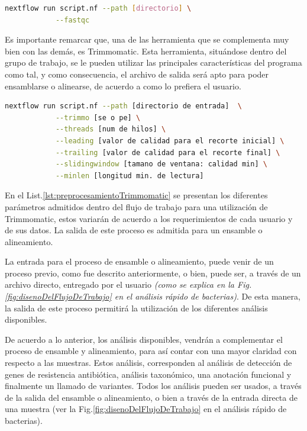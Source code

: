 \documentclass[12pt]{article}
\begin{document}
\begin{center}
    \begin{lstlisting}[language=bash, caption=Comando para el preprocesamiento de las lecturas con Fastqc \emph{(elaboración propia)}., label=lst:preprocesamientoFastqc]
        nextflow run script.nf --path [directorio] \
            --fastqc
    \end{lstlisting}
\end{center}

Es importante remarcar que, una de las  herramienta que 
se complementa muy bien con las demás, es Trimmomatic. 
Esta herramienta, situándose dentro del grupo de trabajo, 
se le pueden utilizar las principales características del 
programa como tal, y como consecuencia, el archivo de salida 
será  apto para poder ensamblarse o alinearse, de acuerdo a  
como lo prefiera el usuario.

\newpage

\begin{center}
    \begin{lstlisting}[language=bash, caption=Comando de ejecución de etapa de pre procesamiento \emph{(elaboración propia)}., label=lst:preprocesamientoTrimmomatic]
        nextflow run script.nf --path [directorio de entrada]  \
            --trimmo [se o pe] \
            --threads [num de hilos] \
            --leading [valor de calidad para el recorte inicial] \
            --trailing [valor de calidad para el recorte final] \
            --slidingwindow [tamano de ventana: calidad min] \
            --minlen [longitud min. de lectura]
    \end{lstlisting}
\end{center}

En el List.\ref{lst:preprocesamientoTrimmomatic} se presentan 
los diferentes parámetros admitidos dentro del flujo de trabajo 
para una utilización de Trimmomatic, estos variarán de acuerdo a 
los requerimientos de cada usuario y de sus datos. La salida de 
este proceso es admitida para un ensamble o alineamiento.

La entrada para el proceso de ensamble o alineamiento, puede 
venir de un proceso previo, como fue descrito anteriormente, o bien, 
puede ser, a través de un archivo directo, entregado por el 
usuario \emph{(como se explica en la Fig.
\ref{fig:disenoDelFlujoDeTrabajo} en el análisis 
rápido de bacterias)}. De esta manera, la salida de este 
proceso permitirá la utilización de los diferentes análisis 
disponibles. 

De acuerdo a lo anterior, los análisis disponibles, 
vendrán  a complementar el proceso de ensamble y alineamiento, 
para así contar con  una mayor claridad con respecto a las muestras. 
Estos análisis, corresponden al análisis de detección de genes 
de resistencia antibiótica, análisis taxonómico, una anotación 
funcional y finalmente un llamado de variantes. Todos los análisis 
pueden ser usados, a través de la salida del ensamble o 
alineamiento, o bien a través de la entrada directa de una 
muestra (ver la Fig.\ref{fig:disenoDelFlujoDeTrabajo} en 
el análisis rápido de bacterias). 
\end{document}
